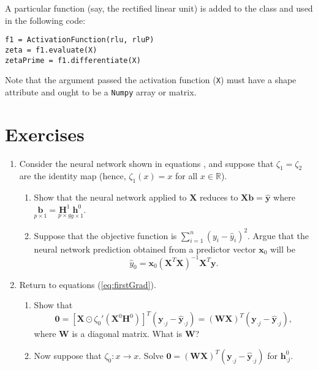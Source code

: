 \documentclass[graybox,envcountchap]{svmono}
\newcommand{\bbf}{\mathbf{b}}
\newcommand{\Xf}{\mathbf{X}}
\newcommand{\Wf}{\mathbf{W}}
\newcommand{\hf}{\mathbf{h}}
\newcommand{\Hf}{\mathbf{H}}
\newcommand{\xf}{\mathbf{x}}
\newcommand{\yf}{\mathbf{y}}
\newcommand{\nn}{neural network}
\newcommand{\w}{\widehat}
\newcommand{\tx}{\texttt}
\begin{document}
\begin{enumerate}
A particular function (say, the rectified linear unit) is added to the class and used in the following code:


\small 
\begin{svgraybox}
\begin{verbatim}
f1 = ActivationFunction(rlu, rluP)   
zeta = f1.evaluate(X)
zetaPrime = f1.differentiate(X)
\end{verbatim}
\end{svgraybox}
\normalsize

Note that the argument passed the activation function (\tx{X}) must have a shape attribute and ought to be a \tx{Numpy} array or matrix.

\end{enumerate}


\section{Exercises}
\begin{enumerate}
 \item \label{problem:lsequivalence} Consider the {\nn } shown in equations \label{eq:2layerDiagram}, and suppose that $\zeta_1 = \zeta_2$ are the identity map (hence, $\zeta_1(x) = x$ for all $x \in \mathbb{R}$). 
 \begin{enumerate}
  \item Show that the {\nn } applied to $\Xf$ reduces to $\Xf \mathbf{b} = \w{\yf}$ where $\underset{p \times 1} {\bbf}=\underset{p \times g } {\Hf^1} \underset{ g \times 1}{\hf^0}$. 
 \item Suppose that the objective function is $\sum_{i=1}^n(y_i - \w{y}_i)^2$.  Argue that the {\nn } prediction obtained from a predictor vector $\xf_0$ will be
\begin{equation}\label{eq:ls}
 \w{y}_0 = \xf_0 (\Xf^T\Xf)^{-1}\Xf^T\yf.
\end{equation}
 \end{enumerate}
 
\item Return to equations (\ref{eq:firstGrad}).
\begin{enumerate}
 \item Show that 
 \begin{equation}
  \mathbf{0} = {\left[ {\Xf\odot { \zeta_0'\left( {\Xf^0}{\Hf^0} \right)}}\right]}^T
  {(\yf_{\cdot j } -\w{\yf}_{\cdot j } )} = \left( \Wf \Xf  \right)^T{(\yf_{\cdot j } -\w{\yf}_{\cdot j } )},
 \end{equation}
 where $\Wf$ is a diagonal matrix. What is $\Wf$?
 \item Now suppose that $\zeta_0:x \rightarrow x$. Solve $\mathbf{0} = \left( \Wf \Xf  \right)^T{(\yf_{\cdot j } -\w{\yf}_{\cdot j } )}$ for  $\hf_{\cdot j}^0$.

\end{enumerate}
 
\end{enumerate}
\end{document}
